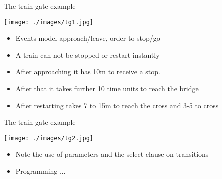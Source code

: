 \documentclass{beamer}
\def\dgold#1{{\darkgoldenrod #1}}
\def\uppaal{\textsc{Uppaal}}
\begin{document}
%
%
%
%
%
%
\begin{slide}{The train gate example}
\small

\begin{center}
\texttt{[image: ./images/tg1.jpg]} 
\end{center}

\begin{itemize}
\item Events model approach/leave, order to stop/go
\item A train can not be stopped or restart instantly
\item After approaching  it has 10m to receive a stop. 
\item After that it  takes further 10 time units to reach the bridge
\item After restarting takes 7 to 15m to reach the cross and 3-5 to cross
\end{itemize}

\end{slide}


\begin{slide}{The train gate example}
\small

\begin{center}
\texttt{[image: ./images/tg2.jpg]} 
\end{center}

\begin{itemize}
\item Note the use of parameters and the select clause on transitions
\item Programming ...
\end{itemize}

\end{slide}
\end{document}
